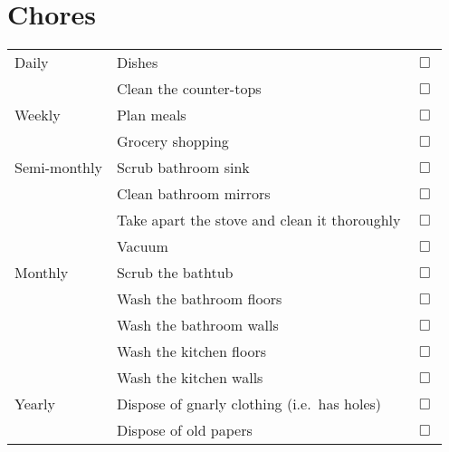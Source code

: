 \documentclass[12pt]{article}
\newcommand{\todo}[1]{& #1 & $\Box$ \\ }
\begin{document}
\section*{Chores}

\begin{tabularx}{\textwidth}{lXm{1em}}
	\toprule
	Daily
		\todo{ 		Dishes 											}
		\todo{		Clean the counter-tops							}
	\midrule
	Weekly
		\todo{ 		Plan meals										}
		\todo{ 		Grocery shopping 								}
	\midrule 
	Semi-monthly
		\todo{ 		Scrub bathroom sink 							}
		\todo{ 		Clean bathroom mirrors 							}
		\todo{ 		Take apart the stove and clean it thoroughly 	}
		\todo{ 		Vacuum 											}
  \midrule
	 Monthly		
	 	\todo{ 		Scrub the bathtub 								}
		\todo{		Wash the bathroom floors 						}
		\todo{		Wash the bathroom walls 						}
		\todo{		Wash the kitchen floors 						}
		\todo{		Wash the kitchen walls 							}
  \midrule
	 Yearly
	 	\todo{		Dispose of gnarly clothing (i.e.\ has holes)	}
		\todo{ 		Dispose of old papers 							}
  \bottomrule
\end{tabularx}
\end{document}
